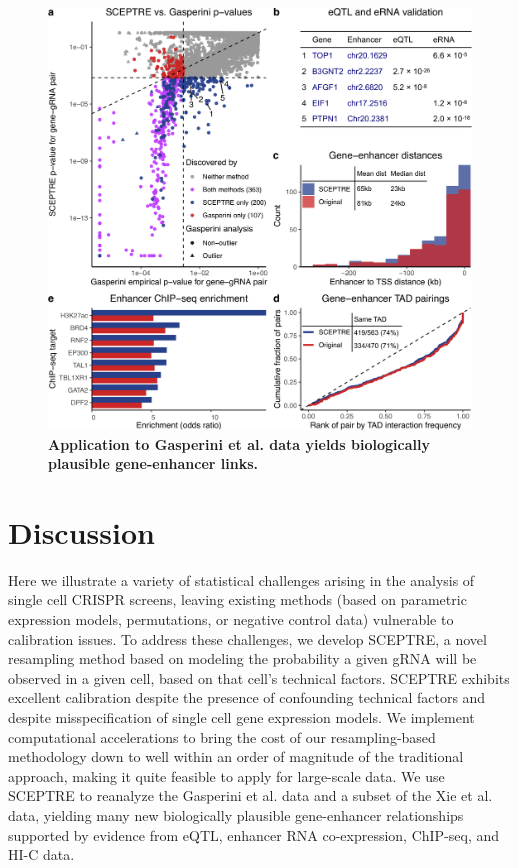 \documentclass{nature}
\begin{document}
\begin{figure}
\includegraphics[width = \textwidth]{figures/Figure4/Figure4_cropped.pdf}
	\caption{\textbf{Application to Gasperini et al. data yields biologically plausible gene-enhancer links.} }
	\label{fig:application}
\end{figure}

\clearpage


\section*{Discussion}

Here we illustrate a variety of statistical challenges arising in the analysis of single cell CRISPR screens, leaving existing methods (based on parametric expression models, permutations, or negative control data) vulnerable to calibration issues. To address these challenges, we develop SCEPTRE, a novel resampling method based on modeling the probability a given gRNA will be observed in a given cell, based on that cell's technical factors. SCEPTRE exhibits excellent calibration despite the presence of confounding technical factors and despite misspecification of single cell gene expression models. We implement computational accelerations to bring the cost of our resampling-based methodology down to well within an order of magnitude of the traditional approach, making it quite feasible to apply for large-scale data. We use SCEPTRE to reanalyze the Gasperini et al. data and a subset of the Xie et al. data, yielding many new biologically plausible gene-enhancer relationships supported by evidence from eQTL, enhancer RNA co-expression, ChIP-seq, and HI-C data. 
\end{document}
